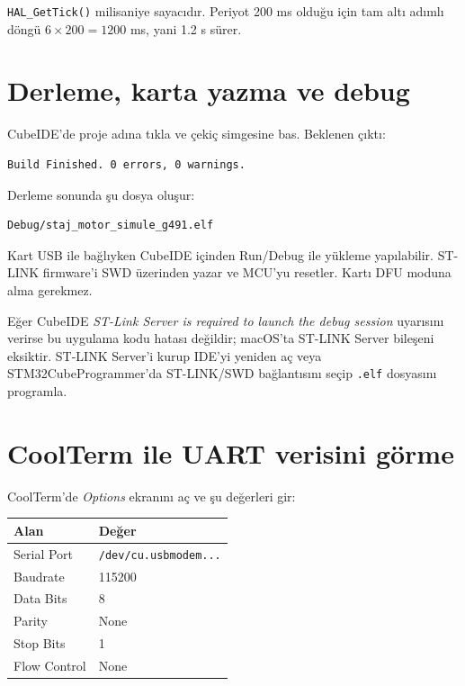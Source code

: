 \documentclass[11pt,a4paper]{article}
\begin{document}
\texttt{HAL\_GetTick()} milisaniye sayacıdır. Periyot 200 ms olduğu için tam
altı adımlı döngü $6 \times 200 = 1200$ ms, yani 1.2 s sürer.

\section{Derleme, karta yazma ve debug}

CubeIDE'de proje adına tıkla ve çekiç simgesine bas. Beklenen çıktı:

\begin{lstlisting}
Build Finished. 0 errors, 0 warnings.
\end{lstlisting}

Derleme sonunda şu dosya oluşur:

\begin{lstlisting}
Debug/staj_motor_simule_g491.elf
\end{lstlisting}

Kart USB ile bağlıyken CubeIDE içinden Run/Debug ile yükleme yapılabilir.
ST-LINK firmware'i SWD üzerinden yazar ve MCU'yu resetler. Kartı DFU moduna
alma gerekmez.

Eğer CubeIDE \textit{ST-Link Server is required to launch the debug session}
uyarısını verirse bu uygulama kodu hatası değildir; macOS'ta ST-LINK Server
bileşeni eksiktir. ST-LINK Server'i kurup IDE'yi yeniden aç veya
STM32CubeProgrammer'da ST-LINK/SWD bağlantısını seçip \texttt{.elf} dosyasını
programla.

\section{CoolTerm ile UART verisini görme}

CoolTerm'de \textit{Options} ekranını aç ve şu değerleri gir:

\begin{center}
\begin{tabular}{ll}
\toprule
Alan & Değer \\
\midrule
Serial Port & \texttt{/dev/cu.usbmodem...} \\
Baudrate & 115200 \\
Data Bits & 8 \\
Parity & None \\
Stop Bits & 1 \\
Flow Control & None \\
\bottomrule
\end{tabular}
\end{center}
\end{document}

